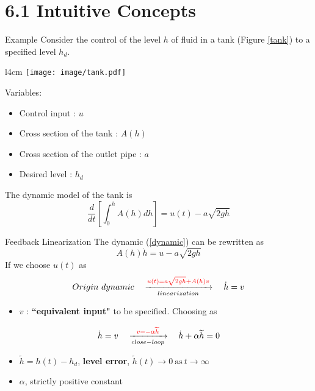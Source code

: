 \documentclass{beamer}
\begin{document}
  \section{6.1 Intuitive Concepts}

  \begin{frame}{Example}
    Consider the control of the level $h$ of fluid in a tank (Figure \ref{tank}) to a specified level $h_{d}$.

    \begin{wrapfigure}{l}{4cm}
    \vspace{-10pt}
    \texttt{[image: image/tank.pdf]}\\
    \vspace{-15pt}
    \caption{Fluid level control in a tank}\label{tank}
    \vspace{-10pt}
    \end{wrapfigure}

    Variables:
    \begin{itemize}
      \item \small{Control input} : $u$
      \item \small{Cross section of the tank} : $A(h)$
      \item \small{Cross section of the outlet pipe} : $a$
      \item \small{Desired level} : $h_{d}$
    \end{itemize}

    The dynamic model of the tank is
    \begin{equation}\label{dynamic}
      \frac{d}{dt}\left[\int_{0}^{h}A(h)dh\right] = u(t) - a \sqrt{2gh}
    \end{equation}

  \end{frame}


  \begin{frame}{Feedback Linearization}
  The dynamic (\ref{dynamic}) can be rewritten as
  $$ A(h)\dot{h} = u-a\sqrt{2gh} $$
  If we choose $u(t)$ as
  $$
  Origin~dynamic \quad \xrightarrow[linearization]{{\color{red} u(t) = a\sqrt{2gh} + A(h)v}} \quad \dot{h}=v
  $$
  \vspace{-20pt}
  \begin{itemize}
    \item $v$ : \textbf{``equivalent input"} to be specified. Choosing as
  \end{itemize}
  $$
   \dot{h}=v \quad \xrightarrow[close-loop]{{\color{red} v=-\alpha \widetilde{h}}} \quad \dot{h}+\alpha \widetilde{h}=0
  $$
  \vspace{-20pt}
  \begin{itemize}
    \item $\widetilde{h} = h(t)-h_{d}$, \textbf{level error}, $\widetilde{h}(t)\rightarrow 0 ~\text{as}~ t \rightarrow \infty$
    \item $\alpha$, strictly positive constant
  \end{itemize}
  \end{frame}
\end{document}
